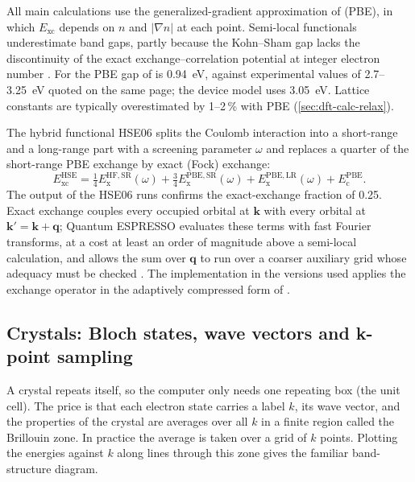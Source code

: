 All main calculations use the generalized-gradient approximation of \citet{Perdew1996} (PBE), in which $E_{\mathrm{xc}}$
depends on $n$ and $|\nabla n|$ at each point. Semi-local functionals underestimate band gaps, partly because the
Kohn--Sham gap lacks the discontinuity of the exact exchange--correlation potential at integer electron number
\citep{PerdewLevy1983,ShamSchluter1983}. For \InO{} the PBE gap of \citet[p.~21542]{Lin2022} is 0.94~eV, against
experimental values of 2.7--3.25~eV quoted on the same page; the device model uses 3.05~eV. Lattice constants are
typically overestimated by 1--2\,\% with PBE (\cref{sec:dft-calc-relax}).

The hybrid functional HSE06 \citep{Heyd2003,Heyd2006,Krukau2006} splits the Coulomb interaction into a short-range and a
long-range part with a screening parameter $\omega$ and replaces a quarter of the short-range PBE exchange by exact
(Fock) exchange:
\begin{equation}
E_{\mathrm{xc}}^{\mathrm{HSE}} = \tfrac{1}{4}E_{\mathrm{x}}^{\mathrm{HF,SR}}(\omega) + \tfrac{3}{4}E_{\mathrm{x}}^{\mathrm{PBE,SR}}(\omega)
+ E_{\mathrm{x}}^{\mathrm{PBE,LR}}(\omega) + E_{\mathrm{c}}^{\mathrm{PBE}} .
\label{eq:dft-hse}
\end{equation}
The output of the HSE06 runs confirms the exact-exchange fraction of 0.25. Exact exchange couples every occupied orbital
at $\mathbf{k}$ with every orbital at $\mathbf{k}' = \mathbf{k}+\mathbf{q}$; Quantum ESPRESSO evaluates these terms with
fast Fourier transforms, at a cost at least an order of magnitude above a semi-local calculation, and allows the sum
over $\mathbf{q}$ to run over a coarser auxiliary grid whose adequacy must be checked
\citep[pp.~16--17]{Giannozzi2009}. The implementation in the versions used applies the exchange operator in the
adaptively compressed form of \citet{LinL2016}.

\subsection{Crystals: Bloch states, wave vectors and k-point sampling}
\label{sec:dft-bloch}

\begin{dftplain}
A crystal repeats itself, so the computer only needs one repeating box (the unit cell). The price is that each electron
state carries a label $k$, its wave vector, and the properties of the crystal are averages over all $k$ in a finite
region called the Brillouin zone. In practice the average is taken over a grid of $k$ points. Plotting the energies
against $k$ along lines through this zone gives the familiar band-structure diagram.
\end{dftplain}

